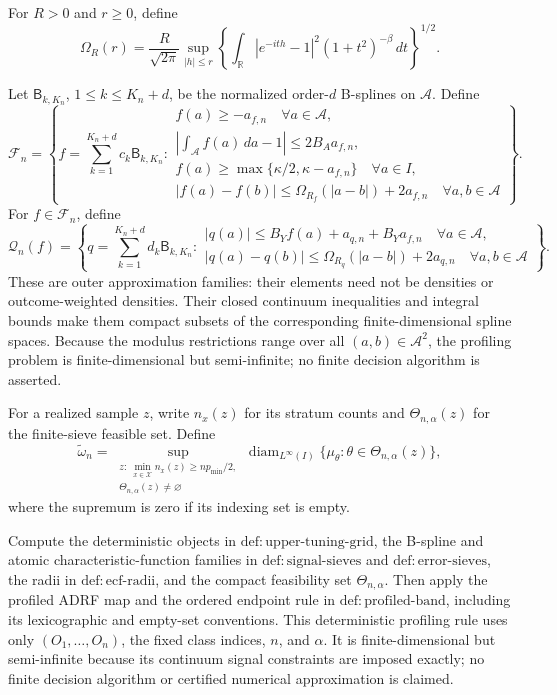 For \(R>0\) and \(r\ge 0\), define
\[
 \Omega_R(r)=\frac{R}{\sqrt{2\pi}}
 \sup_{|h|\le r}
 \left\{\int_{\mathbb R}|e^{-ith}-1|^2(1+t^2)^{-\beta}\,dt\right\}^{1/2}.
\]

Let \(\mathsf B_{k,K_n}\), \(1\le k\le K_n+d\), be the normalized order-\(d\) B-splines on \(\mathcal A\). Define
\[
 \mathscr F_n=\left\{f=\sum_{k=1}^{K_n+d}c_k\mathsf B_{k,K_n}:
 \begin{array}{l}
 f(a)\ge-a_{f,n}\quad\forall a\in\mathcal A,\\
 \left|\int_{\mathcal A}f(a)\,da-1\right|\le2B_Aa_{f,n},\\
 f(a)\ge\max\{\kappa/2,\kappa-a_{f,n}\}\quad\forall a\in I,\\
 |f(a)-f(b)|\le\Omega_{R_f}(|a-b|)+2a_{f,n}
 \quad\forall a,b\in\mathcal A
 \end{array}
 \right\}.
\]
For \(f\in\mathscr F_n\), define
\[
 \mathscr Q_n(f)=\left\{q=\sum_{k=1}^{K_n+d}d_k\mathsf B_{k,K_n}:
 \begin{array}{l}
 |q(a)|\le B_Yf(a)+a_{q,n}+B_Ya_{f,n}\quad\forall a\in\mathcal A,\\
 |q(a)-q(b)|\le\Omega_{R_q}(|a-b|)+2a_{q,n}
 \quad\forall a,b\in\mathcal A
 \end{array}
 \right\}.
\]
These are outer approximation families: their elements need not be densities or outcome-weighted densities. Their closed continuum inequalities and integral bounds make them compact subsets of the corresponding finite-dimensional spline spaces. Because the modulus restrictions range over all \((a,b)\in\mathcal A^2\), the profiling problem is finite-dimensional but semi-infinite; no finite decision algorithm is asserted.

For a realized sample \(z\), write \(n_x(z)\) for its stratum counts and \(\Theta_{n,\alpha}(z)\) for the finite-sieve feasible set. Define
\[
 \widetilde\omega_n=
 \sup_{\substack{z:\ \min_{x\in\mathcal X}n_x(z)\ge np_{\min}/2,\\
                  \Theta_{n,\alpha}(z)\ne\varnothing}}
 \operatorname{diam}_{L^\infty(I)}
 \{\mu_\theta:\theta\in\Theta_{n,\alpha}(z)\},
\]
where the supremum is zero if its indexing set is empty.

Compute the deterministic objects in \(\mathrm{def{:}upper\text{-}tuning\text{-}grid}\), the B-spline and atomic characteristic-function families in \(\mathrm{def{:}signal\text{-}sieves}\) and \(\mathrm{def{:}error\text{-}sieves}\), the radii in \(\mathrm{def{:}ecf\text{-}radii}\), and the compact feasibility set \(\Theta_{n,\alpha}\). Then apply the profiled ADRF map and the ordered endpoint rule in \(\mathrm{def{:}profiled\text{-}band}\), including its lexicographic and empty-set conventions. This deterministic profiling rule uses only \((O_1,\ldots,O_n)\), the fixed class indices, \(n\), and \(\alpha\). It is finite-dimensional but semi-infinite because its continuum signal constraints are imposed exactly; no finite decision algorithm or certified numerical approximation is claimed.

